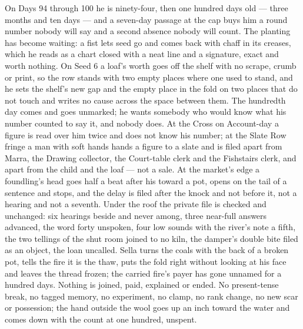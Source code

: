 \documentclass{design/chronicle}
\begin{document}
{On Days 94 through 100 he is ninety-four, then one hundred days old --- three months and ten days --- and a seven-day passage at the cap buys him a round number nobody will say and a second absence nobody will count. The planting has become waiting: a fist lets seed go and comes back with chaff in its creases, which he reads as a chart closed with a neat line and a signature, exact and worth nothing. On Seed 6 a loaf’s worth goes off the shelf with no scrape, crumb or print, so the row stands with two empty places where one used to stand, and he sets the shelf’s new gap and the empty place in the fold on two places that do not touch and writes no cause across the space between them. The hundredth day comes and goes unmarked; he wants somebody who would know what his number counted to say it, and nobody does. At the Cross on Account-day a figure is read over him twice and does not know his number; at the Slate Row fringe a man with soft hands hands a figure to a slate and is filed apart from Marra, the Drawing collector, the Court-table clerk and the Fishstairs clerk, and apart from the child and the loaf --- not a sale. At the market’s edge a foundling’s head goes half a beat after his toward a pot, opens on the tail of a sentence and stops, and the delay is filed after the knock and not before it, not a hearing and not a seventh. Under the roof the private file is checked and unchanged: six hearings beside and never among, three near-full answers advanced, the word forty unspoken, four low sounds with the river’s note a fifth, the two tellings of the shut room joined to no kiln, the damper’s double bite filed as an object, the loan uncalled. Sella turns the coals with the back of a broken pot, tells the fire it is the thaw, puts the fold right without looking at his face and leaves the thread frozen; the carried fire’s payer has gone unnamed for a hundred days. Nothing is joined, paid, explained or ended. No present-tense break, no tagged memory, no experiment, no clamp, no rank change, no new scar or possession; the hand outside the wool goes up an inch toward the water and comes down with the count at one hundred, unspent.

}
\end{document}
